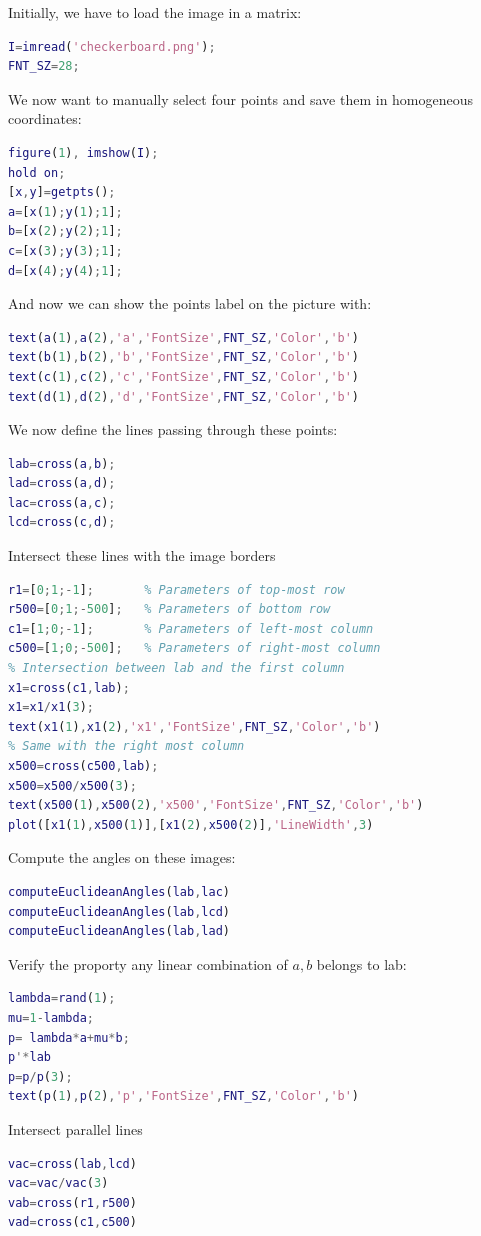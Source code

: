 \documentclass[12pt, a4paper]{report}
\newtheorem[style=M,bodystyle=\normalfont]{theorem}{Theorem}
\newtheorem[style=M,bodystyle=\normalfont]{corollary}{Corollary}
\newtheorem[style=M,bodystyle=\normalfont]{lemma}{Lemma}
\newtheorem[style=M,bodystyle=\normalfont]{definition}{Definition}
\begin{document}
\begin{Answer}[ref=1]
    Initially, we have to load the image in a matrix: 
    \begin{lstlisting}[language=Matlab]
I=imread('checkerboard.png');
FNT_SZ=28;
    \end{lstlisting}
    We now want to manually select four points and save them in homogeneous coordinates: 
    \begin{lstlisting}[language=Matlab]
figure(1), imshow(I);
hold on;
[x,y]=getpts();
a=[x(1);y(1);1];
b=[x(2);y(2);1];
c=[x(3);y(3);1];
d=[x(4);y(4);1];
    \end{lstlisting}
    And now we can show the points label on the picture with: 
    \begin{lstlisting}[language=Matlab]
text(a(1),a(2),'a','FontSize',FNT_SZ,'Color','b')
text(b(1),b(2),'b','FontSize',FNT_SZ,'Color','b')
text(c(1),c(2),'c','FontSize',FNT_SZ,'Color','b')
text(d(1),d(2),'d','FontSize',FNT_SZ,'Color','b')
    \end{lstlisting}
    We now define the lines passing through these points: 
    \begin{lstlisting}[language=Matlab]
lab=cross(a,b); 
lad=cross(a,d); 
lac=cross(a,c); 
lcd=cross(c,d);
    \end{lstlisting}
    Intersect these lines with the image borders
    \begin{lstlisting}[language=Matlab]
r1=[0;1;-1];       % Parameters of top-most row
r500=[0;1;-500];   % Parameters of bottom row
c1=[1;0;-1];       % Parameters of left-most column
c500=[1;0;-500];   % Parameters of right-most column
% Intersection between lab and the first column
x1=cross(c1,lab); 
x1=x1/x1(3); 
text(x1(1),x1(2),'x1','FontSize',FNT_SZ,'Color','b')
% Same with the right most column
x500=cross(c500,lab);
x500=x500/x500(3);
text(x500(1),x500(2),'x500','FontSize',FNT_SZ,'Color','b')
plot([x1(1),x500(1)],[x1(2),x500(2)],'LineWidth',3)
        \end{lstlisting}
    Compute the angles on these images:
    \begin{lstlisting}[language=Matlab]
computeEuclideanAngles(lab,lac) 
computeEuclideanAngles(lab,lcd) 
computeEuclideanAngles(lab,lad) 
    \end{lstlisting}
    Verify the proporty any linear combination of $a,b$ belongs to lab: 
    \begin{lstlisting}[language=Matlab]
lambda=rand(1);
mu=1-lambda;
p= lambda*a+mu*b;
p'*lab
p=p/p(3);
text(p(1),p(2),'p','FontSize',FNT_SZ,'Color','b')
    \end{lstlisting}
    Intersect parallel lines
    \begin{lstlisting}[language=Matlab]
vac=cross(lab,lcd)
vac=vac/vac(3) 
vab=cross(r1,r500)
vad=cross(c1,c500)
    \end{lstlisting}

\end{Answer}
\end{document}
